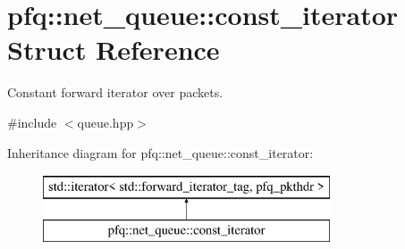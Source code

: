 \hypertarget{structpfq_1_1net__queue_1_1const__iterator}{\section{pfq\+:\+:net\+\_\+queue\+:\+:const\+\_\+iterator Struct Reference}
\label{structpfq_1_1net__queue_1_1const__iterator}
}


Constant forward iterator over packets.  




{\ttfamily \#include $<$queue.\+hpp$>$}

Inheritance diagram for pfq\+:\+:net\+\_\+queue\+:\+:const\+\_\+iterator\+:\begin{figure}[H]
\begin{center}
\leavevmode
\includegraphics[height=2.000000cm]{structpfq_1_1net__queue_1_1const__iterator}
\end{center}
\end{figure}
